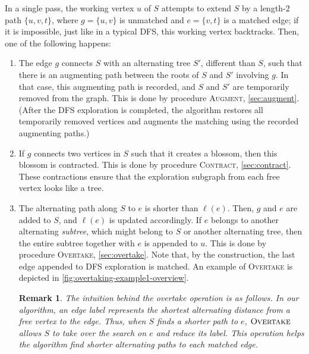 \documentclass{article}
\newcommand{\algOvertake}{\textsc{Overtake}\xspace}
\newcommand{\algAugment}{\textsc{Augment}\xspace}
\newcommand{\algContract}{\textsc{Contract}\xspace}
\newtheorem{remark}{Remark}
\begin{document}
In a single pass, the working vertex $u$ of $S$ attempts to extend $S$ by a length-$2$ path $\{u, v, t\}$, where $g = \{u, v\}$ is unmatched and $e = \{v, t\}$ is a matched edge; if it is impossible, just like in a typical DFS, this working vertex backtracks. Then, one of the following happens:
\begin{enumerate}
    \item The edge $g$ connects $S$ with an alternating tree $S'$, different than $S$, such that there is an augmenting path between the roots of $S$ and $S'$ involving $g$.
    In that case, this augmenting path is recorded, and $S$ and $S'$ are temporarily removed from the graph.
    This is done by procedure \algAugment, \cref{sec:augment}.
    (After the DFS exploration is completed, the algorithm restores all temporarily removed vertices and augments the matching using the recorded augmenting paths.)
    
    \item If $g$ connects two vertices in $S$ such that it creates a blossom, then this blossom is contracted. This is done by procedure \algContract, \cref{sec:contract}. These contractions ensure that the exploration subgraph from each free vertex looks like a tree.

    \item The alternating path along $S$ to $e$ is shorter than $\ell(e)$. Then, $g$ and $e$ are added to $S$, and $\ell(e)$ is updated accordingly. If $e$ belongs to another alternating \emph{subtree}, which might belong to $S$ or another alternating tree, then the entire subtree together with $e$ is appended to $u$. This is done by procedure \algOvertake, \cref{sec:overtake}.
    Note that, by the construction, the last edge appended to DFS exploration is matched.
    An example of \algOvertake is depicted in \cref{fig:overtaking-example1-overview}.
    \begin{remark}
        The intuition behind the overtake operation is as follows.
        In our algorithm, an edge label represents the shortest alternating distance from a free vertex to the edge. Thus, when $S$ finds a shorter path to $e$, $\algOvertake$ allows $S$ to take over the search on $e$ and reduce its label.
        This operation helps the algorithm find shorter alternating paths to each matched edge.
    \end{remark}
    
\end{enumerate}
\end{document}
